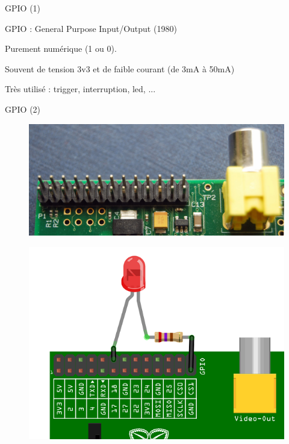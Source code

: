 \documentclass[12pt, t]{beamer}
\begin{document}
\begin{frame}{GPIO (1)}

    \vspace{20pt}
    GPIO : General Purpose Input/Output (1980)

    \vspace{20pt}
    Purement numérique (1 ou 0).

    \vspace{20pt}
    Souvent de tension 3v3 et de faible courant (de 3mA à 50mA)

    \vspace{20pt}
    Très utilisé : trigger, interruption, led, ...

\end{frame}

\begin{frame}{GPIO (2)}

    \vspace{10pt}
    \begin{figure}
        \centering
        \includegraphics[scale=0.6]{gpio-pins.jpg}
    \end{figure}

    \begin{figure}
        \centering
        \includegraphics[scale=0.4]{gpio-led.png}
    \end{figure}

\end{frame}
\end{document}
